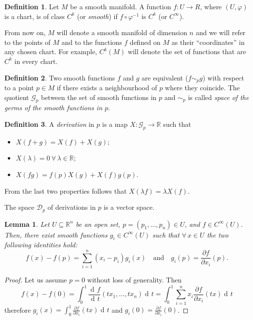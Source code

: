 \documentclass[a4paper,12pt]{book}
\newcommand{\dd}{\mathop{\mathrm{d}\!}{}}
\newtheorem{lemma}{Lemma}
\theoremstyle{definition}
\newtheorem{definition}{Definition}
\theoremstyle{remark}
\begin{document}
\begin{definition}
Let $M$ be a smooth manifold. A function $f\colon U\to R$, where $(U,\varphi)$ is a chart, is of class $C^k$ (or \emph{smooth}) if $f\circ\varphi^{-1}$ is $C^k$ (or $C^\infty$).
\end{definition}

From now on, $M$ will denote a smooth manifold of dimension $n$ and we will refer to the points of $M$ and to the functions $f$ defined on $M$ as their ``coordinates'' in any chosen chart. For example, $C^k(M)$ will denote the set of functions that are $C^k$ in every chart.

\begin{definition}
Two smooth functions $f$ and $g$ are equivalent ($f\sim_p g$) with respect to a point $p\in M$ if there exists a neighbourhood of $p$ where they coincide. The quotient $\mathcal G_p$ between the set of smooth functions in $p$ and $\sim_p$ is called \emph{space of the germs of the smooth functions in $p$}.
\end{definition}

\begin{definition}
A \emph{derivation} in $p$ is a map $X\colon \mathcal G_p\to\mathbb R$ such that
\begin{itemize}
\item $X(f+g)=X(f)+X(g)$;
\item $X(\lambda)=0\ \forall\,\lambda\in\mathbb R$;
\item $X(fg)=f(p)X(g)+X(f)g(p)$.
\end{itemize}
From the last two properties follows that $X(\lambda f)=\lambda X(f)$.
\end{definition}
The space $\mathcal D_p$ of derivations in $p$ is a vector space.

\begin{lemma}
\label{lemma:smooth}
Let $U\subseteq\mathbb R^n$ be an open set, $p=(p_1,\ldots,p_n)\in U$, and $f\in C^\infty(U)$. Then, there exist smooth functions $g_i\in C^\infty(U)$ such that $\forall\, x\in U$ the two following identities hold:
\[f(x)-f(p)=\sum_{i=1}^n(x_i-p_i)g_i(x)\quad\text{and}\quad g_i(p)=\frac{\partial f}{\partial x_i}(p).\]
\end{lemma}
\begin{proof}
Let us assume $p=0$ without loss of generality. Then
\[f(x)-f(0)=\int_0^1\frac{\dd f}{\dd t}(tx_1,\ldots,tx_n)\dd t=\int_0^1\sum_{i=1}^nx_i\frac{\partial f}{\partial x_i}(tx)\dd t\]
therefore $g_i(x)=\int_0^1\frac{\partial f}{\partial x_i}(tx)\dd t$ and $g_i(0)=\frac{\partial f}{\partial x_i}(0)$.
\end{proof}
\end{document}
